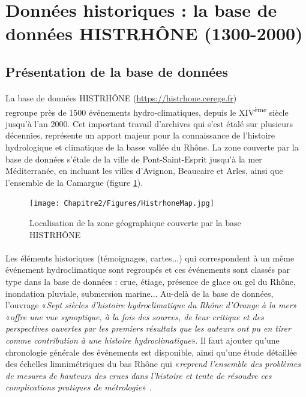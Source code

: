 \FloatBarrier

\section{Données historiques : la base de données HISTRHÔNE (1300-2000)}
\label{sec:HISTRHONE}
	\subsection{Présentation de la base de données}

	\paragraph{} La base de données HISTRHÔNE (\url{https://histrhone.cerege.fr}) \\ \citep{pichard_sept_2014} regroupe près de 1500 événements hydro-climatiques, depuis le XIV\textsuperscript{ème} siècle jusqu'à l'an 2000. Cet important travail d'archives qui s'est étalé sur plusieurs décennies, représente un apport majeur pour la connaissance de l'histoire hydrologique et climatique de la basse vallée du Rhône. La zone couverte par la base de données s'étale de la ville de Pont-Saint-Esprit jusqu'à la mer Méditerranée, en incluant les villes d'Avignon, Beaucaire et Arles, ainsi que l'ensemble de la Camargue (figure \ref{fig:MapHistrhone}). 
	
	\begin{figure}[h]
	\centering
		\texttt{[image: Chapitre2/Figures/HistrhoneMap.jpg]}
        \caption{Localisation de la zone géographique couverte par la base HISTRHÔNE \citep{pichard_sept_2014} }
		\label{fig:MapHistrhone}
	\end{figure}
	
	\paragraph{} Les éléments historiques (témoignages, cartes...) qui correspondent à un même événement hydroclimatique sont regroupés et ces événements sont classés par type dans la base de données : crue, étiage, présence de glace ou gel du Rhône, inondation pluviale, submersion marine... Au-delà de la base de données, l'ouvrage «\textit{Sept siècles d'histoire hydroclimatique du Rhône d'Orange à la mer}» \citep{pichard_sept_2014} «\textit{offre une vue synoptique, à la fois des sources, de leur critique et des perspectives ouvertes par les premiers résultats que les auteurs ont pu en tirer comme contribution à une histoire hydroclimatique}». Il faut ajouter qu'une chronologie générale des événements est disponible, ainsi qu'une étude détaillée des échelles limnimétriques du bas Rhône qui «\textit{reprend l'ensemble des problèmes de mesures de hauteurs des crues dans l'histoire et tente de résoudre ces complications pratiques de métrologie}» \citep{pichard_hauteurs_2013} .
	
